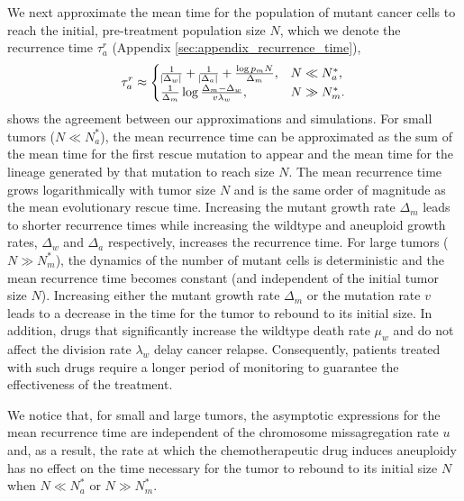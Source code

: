 \documentclass[12pt]{extarticle}
\begin{document}
We next approximate the mean time for the population of mutant cancer cells to reach the initial, pre-treatment population size $N$, which we denote the recurrence time $\tau_a^r$ (Appendix \ref{sec:appendix_recurrence_time}),
\begin{equation} \label{eq:AsymptoticTimeRulesRecurrence}
\tau_a^r \approx \begin{cases}
   \frac{1}{ \abs{\Delta_w}}+\frac{1}{ \abs{\Delta_a}}+\frac{\log p_mN}{\Delta_m} ,&
 N \ll N_a^* ,\\ 
  \frac{1}{\Delta_m}\log\frac{\Delta_m-\Delta_w}{v\lambda_w}  ,&
  N \gg N_m^* .
  \end{cases}
\end{equation}
 shows the agreement between our approximations and simulations.
For small tumors ($N \ll N_a^*$), the mean recurrence time can be approximated as the sum of the mean time for the first rescue mutation to appear and the mean time for the lineage generated by that mutation to reach size $N$. The mean recurrence time grows logarithmically with tumor size $N$ and is the same order of magnitude as the mean evolutionary rescue time. Increasing the mutant growth rate $\Delta_m$ leads to shorter recurrence times while increasing the wildtype and aneuploid growth rates, $\Delta_w$ and $\Delta_a$ respectively, increases the recurrence time.
For large tumors ($N \gg N_m^*$), the dynamics of the number of mutant cells is deterministic and the mean recurrence time becomes constant (and independent of the initial tumor size $N$).
Increasing either the mutant growth rate $\Delta_m$ or the mutation rate $v$ leads to a decrease in the time for the tumor to rebound to its initial size.
In addition, drugs that significantly increase the wildtype death rate $\mu_w$ and do not affect the division rate $\lambda_w$ delay cancer relapse.
Consequently, patients treated with such drugs require a longer period of monitoring to guarantee the effectiveness of the treatment. 

We notice that, for small and large tumors, the asymptotic expressions for the mean recurrence time are independent of the chromosome missagregation rate $u$ and, as a result, the rate at which the chemotherapeutic drug induces aneuploidy has no effect on the time necessary for the tumor to rebound to its initial size $N$ when $N \ll N_a^*$ or $N \gg N_m^*$.
\end{document}
